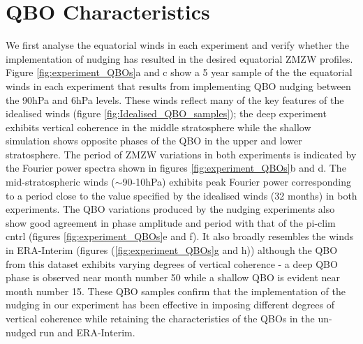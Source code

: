 \section{QBO Characteristics}
We first analyse the equatorial winds in each experiment and verify whether the implementation of nudging has resulted in the desired equatorial ZMZW profiles. Figure \ref{fig:experiment_QBOs}a and c show a 5 year sample of the the equatorial winds in each experiment that results from implementing QBO nudging between the 90hPa and 6hPa levels. These winds reflect many of the key features of the idealised winds (figure \ref{fig:Idealised_QBO_samples}); the deep experiment exhibits vertical coherence in the middle stratosphere while the shallow simulation shows opposite phases of the QBO in the upper and lower stratosphere. The period of ZMZW variations in both experiments is indicated by the Fourier power spectra shown in figures \ref{fig:experiment_QBOs}b and d. The mid-stratospheric winds ($\sim$90-10hPa) exhibits peak Fourier power corresponding to a period close to the value specified by the idealised winds (32 months) in both experiments. The QBO variations produced by the nudging experiments also show good agreement in phase amplitude and period with that of the pi-clim cntrl (figures \ref{fig:experiment_QBOs}e and f). It also broadly resembles the winds in ERA-Interim (figures (\ref{fig:experiment_QBOs}g and h)) although the QBO from this dataset exhibits varying degrees of vertical coherence - a deep QBO phase is observed near month number 50 while a shallow QBO is evident near month number 15. These QBO samples confirm that the implementation of the nudging in our experiment has been effective in imposing different degrees of vertical coherence while retaining the characteristics of the QBOs in the un-nudged run and ERA-Interim.

